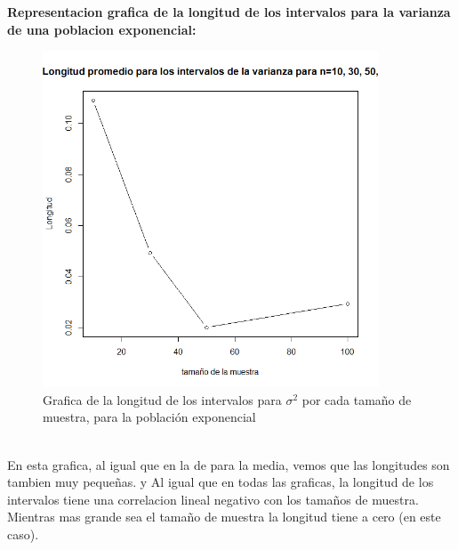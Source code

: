 \documentclass[letterpaper,12pt,onecolumn,titlepage]{article}
\begin{document}
\pagebreak\textbf{Representacion grafica de la longitud de los intervalos para la varianza de una poblacion exponencial:}
~\\ \begin{figure}[!h]
    \begin{center}
        \includegraphics[width=10cm]{Figuras/P1bV.png}
        \caption{Grafica de la longitud de los intervalos para $\sigma^2$ por cada tama\~{n}o de muestra, para la poblaci\'{o}n exponencial}
        \label{fig:Densidad}
    \end{center}
\end{figure}
~\\ En esta grafica, al igual que en la de para la media, vemos que las longitudes son tambien muy peque\~{n}as. y Al igual que en todas las graficas, la longitud de los intervalos tiene una correlacion lineal negativo con los tama\~{n}os de muestra. Mientras mas grande sea el tama\~{n}o de muestra la longitud tiene a cero (en este caso).
\end{document}
